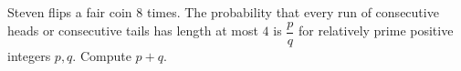 Steven flips a fair coin $8$ times. The probability that every run of consecutive heads or consecutive tails has length at most $4$ is $\dfrac pq$ for relatively prime positive integers $p,q$. Compute $p+q$.
